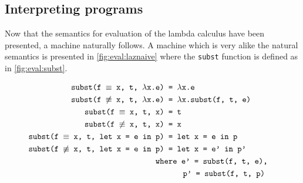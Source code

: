 \subsection{Interpreting programs}
Now that the semantics for evaluation of the lambda calculus have been presented, a machine naturally follows.
A machine which is very alike the natural semantics is presented in \autoref{fig:eval:laznaive} where the \texttt{subst} function is defined as in \autoref{fig:eval:subst}.
\begin{figure}[p]
	\begin{mdframed}
		\begin{align}
			\texttt{subst(f $\equiv$ x, t, $\lambda$x.e) }       & \texttt{= $\lambda$x.e} \tag*{}              \\
			\texttt{subst(f $\not\equiv$ x, t, $\lambda$x.e) }   & \texttt{= $\lambda$x.subst(f, t, e)} \tag*{} \\
			\texttt{subst(f $\equiv$ x, t, x) }                  & \texttt{= t} \tag*{}                         \\
			\texttt{subst(f $\not\equiv$ x, t, x) }              & \texttt{= x} \tag*{}                         \\
			\texttt{subst(f $\equiv$ x, t, let x = e in p) }     & \texttt{= let x = e in p} \tag*{}            \\
			\texttt{subst(f $\not\equiv$ x, t, let x = e in p) } & \texttt{= let x = e' in p'} \tag*{}          \\
			\wherecase{e' = subst(f, t, e),}\tag*{}                                                             \\
			\extracase{p' = subst(f, t, p)}\tag*{}                                                              \\

\end{align}
\end{mdframed}
\end{figure}
